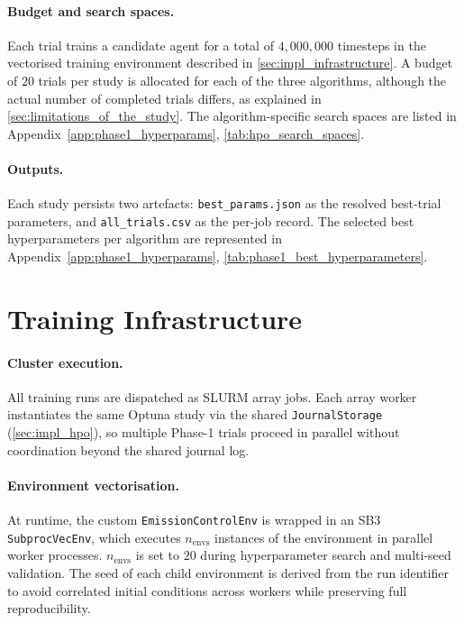 \paragraph{Budget and search spaces.}
Each trial trains a candidate agent for a total of $4{,}000{,}000$ timesteps in the vectorised training environment described in \autoref{sec:impl_infrastructure}. A budget of $20$ trials per study is allocated for each of the three algorithms, although the actual number of completed trials differs, as explained in \autoref{sec:limitations_of_the_study}. The algorithm-specific search spaces are listed in Appendix~\ref{app:phase1_hyperparams}, \autoref{tab:hpo_search_spaces}.

\paragraph{Outputs.}
Each study persists two artefacts: \texttt{best\_params.json} as the resolved best-trial parameters, and \texttt{all\_trials.csv} as the per-job record. The selected best hyperparameters per algorithm are represented in Appendix~\ref{app:phase1_hyperparams}, \autoref{tab:phase1_best_hyperparameters}.

\section{Training Infrastructure}
\label{sec:impl_infrastructure}

\paragraph{Cluster execution.}
All training runs are dispatched as SLURM array jobs. Each array worker instantiates the same Optuna study via the shared \texttt{JournalStorage} (\autoref{sec:impl_hpo}), so multiple Phase-1 trials proceed in parallel without coordination beyond the shared journal log.

\paragraph{Environment vectorisation.}
At runtime, the custom \texttt{EmissionControlEnv} is wrapped in an SB3 \texttt{SubprocVecEnv}, which executes $n_{\text{envs}}$ instances of the environment in parallel worker processes. $n_{\text{envs}}$ is set to $20$ during hyperparameter search and multi-seed validation. The seed of each child environment is derived from the run identifier to avoid correlated initial conditions across workers while preserving full reproducibility.

